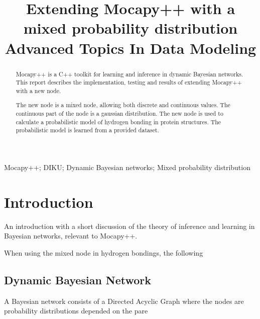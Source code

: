 \documentclass[10pt, conference, compsocconf,a4paper]{IEEEtran}
\begin{document}
\title{Extending Mocapy++ with a mixed probability distribution\\Advanced Topics In Data Modeling}

\author{
}

\maketitle

\begin{abstract}
Mocapy++ is a C++ toolkit for learning and inference in dynamic Bayesian networks. This report describes the implementation, testing and results of extending Mocapy++ with a new node. 

The new node is a mixed node, allowing both discrete and continuous values. The continuous part of the node is a gaussian distribution. The new node is used to calculate a probabilistic model of hydrogen bonding in protein structures. The probabilistic model is learned from a provided dataset.
\end{abstract}

\begin{IEEEkeywords}
Mocapy++; DIKU; Dynamic Bayesian networks; Mixed probability distribution
\end{IEEEkeywords}


\section{Introduction} %
\label{sec:introduction}

% 
% 

An introduction with a short discussion of the theory of inference and learning in Bayesian networks, relevant to Mocapy++.

When using the mixed node in hydrogen bondings, the following 

\subsection{Dynamic Bayesian Network} %
\label{sub:dynamic_bayesian_network}
A Bayesian network consists of a Directed Acyclic Graph where the nodes are probability distributions depended on the pare
\end{document}

